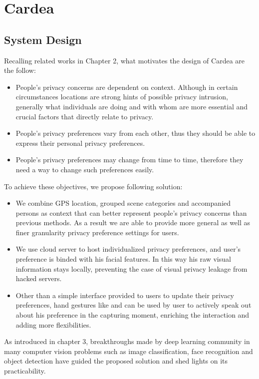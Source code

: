 \chapter{Cardea}\label{sec-cardea}

\section{System Design}
Recalling related works in Chapter 2, what motivates the design of Cardea are the follow:

\begin{itemize}
\item People's privacy concerns are dependent on context. Although in certain circumstances locations are strong hints of possible privacy intrusion, generally what individuals are doing and with whom are more essential and crucial factors that directly relate to privacy.
\item People's privacy preferences vary from each other, thus they should be able to express their personal privacy preferences.
\item People's privacy preferences may change from time to time, therefore they need a way to change such preferences easily.
\end{itemize}

To achieve these objectives, we propose following solution:
\begin{itemize}
\item We combine GPS location, grouped scene categories and accompanied persons as context that can better represent people's privacy concerns than previous methods. As a result we are able to provide more general as well as finer granularity privacy preference settings for users.
\item We use cloud server to host individualized privacy preferences, and user's preference is binded with his facial features. In this way his raw visual information stays locally, preventing the case of visual privacy leakage from hacked servers.
\item Other than a simple interface provided to users to update their privacy preferences, hand gestures like  and  can be used by user to actively speak out about his preference in the capturing moment, enriching the interaction and adding more flexibilities.
\end{itemize}
As introduced in chapter 3, breakthroughs made by deep learning community in many computer vision problems such as image classification, face recognition and object detection have guided the proposed solution and shed lights on its practicability.


